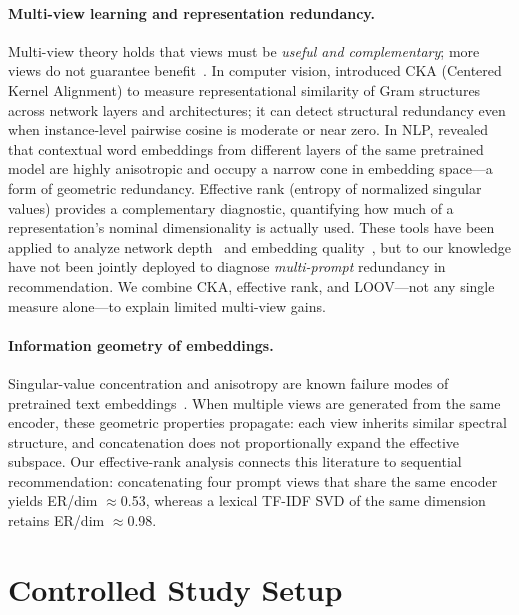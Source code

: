 \documentclass[sigconf,natbib=true,anonymous]{acmart}
\newcommand{\tfidf}{\textsc{TF-IDF}\xspace}
\begin{document}
\paragraph{Multi-view learning and representation redundancy.}
Multi-view theory holds that views must be \emph{useful and complementary}; more views do not guarantee benefit~\cite{xu2013multiview}.
In computer vision, \citet{kornblith2019cka} introduced CKA (Centered Kernel Alignment) to measure representational similarity of Gram structures across network layers and architectures; it can detect structural redundancy even when instance-level pairwise cosine is moderate or near zero.
In NLP, \citet{ethayarajh2019contextual} revealed that contextual word embeddings from different layers of the same pretrained model are highly anisotropic and occupy a narrow cone in embedding space---a form of geometric redundancy.
Effective rank (entropy of normalized singular values) provides a complementary diagnostic, quantifying how much of a representation's nominal dimensionality is actually used.
These tools have been applied to analyze network depth~\cite{kornblith2019cka} and embedding quality~\cite{ethayarajh2019contextual}, but to our knowledge have not been jointly deployed to diagnose \emph{multi-prompt} redundancy in recommendation.
We combine CKA, effective rank, and LOOV---not any single measure alone---to explain limited multi-view gains.

\paragraph{Information geometry of embeddings.}
Singular-value concentration and anisotropy are known failure modes of pretrained text embeddings~\cite{ethayarajh2019contextual}.
When multiple views are generated from the same encoder, these geometric properties propagate: each view inherits similar spectral structure, and concatenation does not proportionally expand the effective subspace.
Our effective-rank analysis connects this literature to sequential recommendation: concatenating four prompt views that share the same encoder yields ER/dim $\approx$0.53, whereas a lexical \tfidf SVD of the same dimension retains ER/dim $\approx$0.98.

\section{Controlled Study Setup}
\label{sec:setup}
\end{document}
